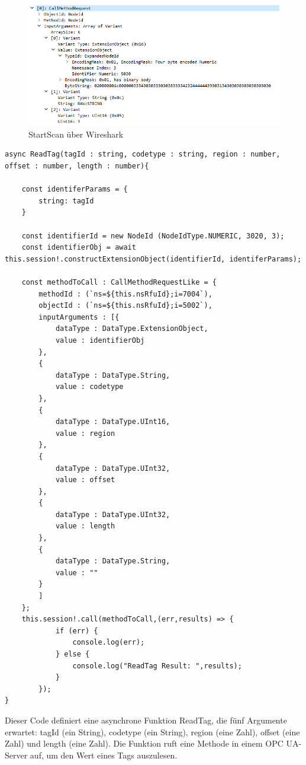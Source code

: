 \begin{figure}[H]
    \centering
    \includegraphics[width=(\textwidth/2)]{Bild/WriteTagWireshark.PNG}
    \caption{StartScan über Wireshark}
    \label{fig:WriteueberWireshark}
\end{figure}

\begin{lstlisting}[style=JavaScript, caption={ReadTag Methode}]
async ReadTag(tagId : string, codetype : string, region : number, offset : number, length : number){

    const identiferParams = {
        string: tagId	
    }

    const identifierId = new NodeId (NodeIdType.NUMERIC, 3020, 3);
    const identifierObj = await this.session!.constructExtensionObject(identifierId, identiferParams);
    
    const methodToCall : CallMethodRequestLike = {
        methodId : (`ns=${this.nsRfuId};i=7004`),
        objectId : (`ns=${this.nsRfuId};i=5002`),
        inputArguments : [{
            dataType : DataType.ExtensionObject,
            value : identifierObj
        },
        {
            dataType : DataType.String,
            value : codetype
        },
        {
            dataType : DataType.UInt16,
            value : region
        },
        {
            dataType : DataType.UInt32,
            value : offset
        },
        {
            dataType : DataType.UInt32,
            value : length
        },
        {
            dataType : DataType.String,
            value : ""
        }
        ]
    };
    this.session!.call(methodToCall,(err,results) => {
            if (err) {
                console.log(err);
            } else {
                console.log("ReadTag Result: ",results);
            }
        });
}
\end{lstlisting}

Dieser Code definiert eine asynchrone Funktion ReadTag, die fünf Argumente erwartet: tagId (ein String), codetype (ein String), region (eine Zahl), offset (eine Zahl) und length (eine Zahl). Die Funktion ruft eine Methode in einem OPC UA-Server auf, um den Wert eines Tags auszulesen.\\

